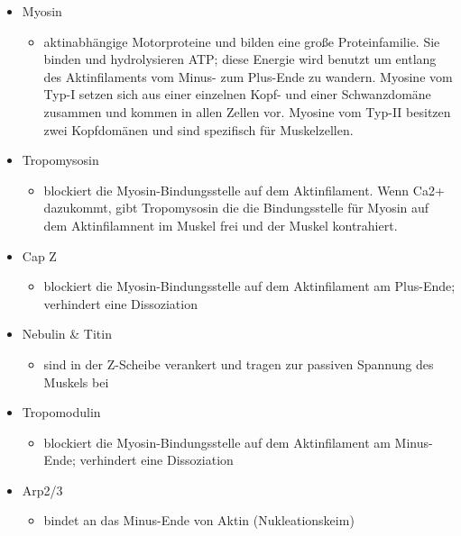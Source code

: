 \documentclass{article}
\begin{document}
\begin{itemize}

    \item Myosin
        \begin{itemize}
            \item aktinabhängige Motorproteine und bilden eine große Proteinfamilie. Sie binden und hydrolysieren ATP; diese Energie wird benutzt um entlang des Aktinfilaments vom Minus- zum Plus-Ende zu wandern. Myosine vom Typ-I setzen sich aus einer einzelnen Kopf- und einer Schwanzdomäne zusammen und kommen in allen Zellen vor. Myosine vom Typ-II besitzen zwei Kopfdomänen und sind spezifisch für Muskelzellen.
        \end{itemize}

    \item Tropomysosin    
        \begin{itemize}
            \item blockiert die Myosin-Bindungsstelle auf dem Aktinfilament. Wenn Ca2+ dazukommt, gibt Tropomysosin die die Bindungsstelle für Myosin auf dem Aktinfilamnent im Muskel frei und der Muskel kontrahiert.
        \end{itemize}
    
    \item Cap Z
        \begin{itemize}
            \item blockiert die Myosin-Bindungsstelle auf dem Aktinfilament am Plus-Ende; verhindert eine Dissoziation
        \end{itemize}
        
    \item Nebulin \& Titin
        \begin{itemize}
            \item sind in der Z-Scheibe verankert und tragen zur passiven Spannung des Muskels bei
        \end{itemize}
        
    \item Tropomodulin
        \begin{itemize}
            \item blockiert die Myosin-Bindungsstelle auf dem Aktinfilament am Minus-Ende; verhindert eine Dissoziation
        \end{itemize}
    
    \item Arp2/3
        \begin{itemize}
            \item bindet an das Minus-Ende von Aktin (Nukleationskeim) 
        \end{itemize}
        

\end{itemize}
\end{document}
